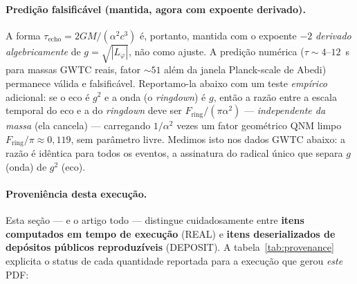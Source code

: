 \documentclass[12pt,a4paper]{article}
\newcommand{\Lphi}{L_{\varphi}}
\begin{document}
\paragraph{Predição falsificável (mantida, agora com expoente derivado).}
A forma $\tau_{\text{echo}} = 2GM/(\alpha^{2}c^{3})$ é, portanto, mantida com o
expoente $-2$ \emph{derivado algebricamente} de $g = \sqrt{|\Lphi|}$, não como
ajuste.  A predição numérica ($\tau \sim 4$--$12$~s para massas GWTC reais, fator
$\sim 51$ além da janela Planck-scale de Abedi) permanece válida e falsificável.
Reportamo-la abaixo com um teste \emph{empírico} adicional: se o eco é $g^{2}$ e
a onda (o \emph{ringdown}) é $g$, então a razão entre a escala temporal do eco e
a do \emph{ringdown} deve ser $F_{\text{ring}}/(\pi\alpha^{2})$ ---
\emph{independente da massa} (ela cancela) --- carregando $1/\alpha^{2}$ vezes um
fator geométrico QNM limpo $F_{\text{ring}}/\pi \approx 0{,}119$, sem parâmetro
livre.  Medimos isto nos dados GWTC abaixo: a razão é idêntica para todos os
eventos, a assinatura do radical único que separa $g$ (onda) de $g^{2}$ (eco).


\paragraph{Proveniência desta execução.}\label{para:provenance}
Esta seção --- e o artigo todo --- distingue cuidadosamente entre
\textbf{itens computados em tempo de execução} (REAL) e \textbf{itens
deserializados de depósitos públicos reproduzíveis} (DEPOSIT).
A tabela~\ref{tab:provenance} explicita o status de cada quantidade
reportada para a execução que gerou \emph{este} PDF:
\end{document}

